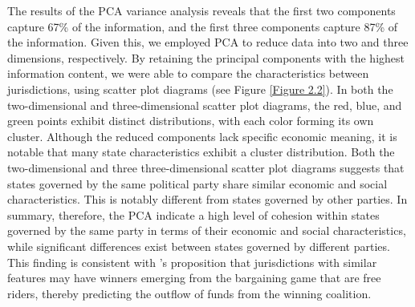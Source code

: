 The results of the PCA variance analysis reveals that the first two components capture 67\% of the information, and the first three components capture 87\% of the information. Given this, we employed PCA to reduce data into two and three dimensions, respectively. By retaining the principal components with the highest information content, we were able to compare the
characteristics between jurisdictions, using scatter plot diagrams (see Figure \ref{Figure 2.2}). In both the two-dimensional and three-dimensional scatter plot diagrams, the red, blue, and green points exhibit distinct distributions, with each color forming its own cluster.
Although the reduced components lack specific economic meaning, it is notable that many state characteristics exhibit a cluster distribution. Both the two-dimensional and three three-dimensional scatter plot diagrams suggests that states governed by the same political party share similar economic and social characteristics. This is notably different from states governed by other parties. In summary, therefore, the PCA indicate a high level of cohesion within states governed by the same party in terms of their economic and social characteristics, while significant differences exist between states governed by different parties. This finding is consistent with \Textcite{martin2018dividing}'s proposition that jurisdictions with similar features may have winners emerging from the bargaining game that are free riders, thereby predicting the outflow of funds from the winning coalition.


